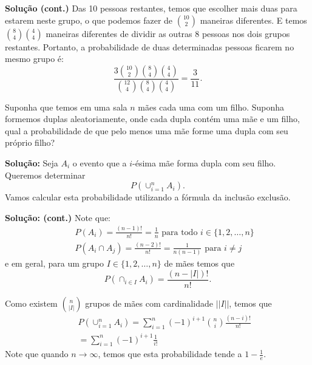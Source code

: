 \begin{frame}
{\bf Solução (cont.)}
Das 10 pessoas restantes, temos que escolher mais duas
para estarem neste grupo, o que podemos fazer de $\binom{10}{2}$
maneiras diferentes. E temos $\binom{8}{4}\binom{4}{4}$ maneiras
diferentes de dividir as outras 8 pessoas nos dois grupos restantes.
Portanto, a probabilidade de duas determinadas pessoas ficarem no
mesmo grupo é:
$$\frac{3\binom{10}{2}\binom{8}{4}\binom{4}{4}}{\binom{12}{4}\binom{8}{4}\binom{4}{4}}=\frac{3}{11}.$$


\begin{exem}
Suponha que temos em uma sala $n$ mães cada uma com um filho. Suponha formemos duplas aleatoriamente, onde cada dupla contém uma mãe e um filho, qual a probabilidade de que pelo menos uma mãe forme uma dupla com seu próprio filho?
\end{exem}

{\bf Solução: } 
Seja $A_i$ o evento que a $i$-ésima mãe forma dupla com seu filho. Queremos determinar
$$P(\cup_{i=1}^{n}A_i).$$
Vamos calcular esta probabilidade utilizando a fórmula da inclusão exclusão. 

\end{frame}

\begin{frame}

{\bf Solução: (cont.)}  Note que:
\begin{eqnarray}
& & P(A_i)=\frac{(n-1)!}{n!}=\frac{1}{n}\mbox{ para todo } i\in\{1,2,\ldots,n\} \nonumber\\
& & P(A_i\cap A_j)=\frac{(n-2)!}{n!}=\frac{1}{n(n-1)}\mbox{ para }i\ne j \nonumber
\end{eqnarray}
e em geral, para um grupo $I\in\{1,2,\ldots,n\}$ de mães temos que
$$P(\cap_{i\in I}A_i)=\frac{(n-|I|)!}{n!}.$$

Como existem $\binom{n}{|I|}$ grupos de mães com cardinalidade $||I||$, temos que
\begin{eqnarray}
& & P(\cup_{i=1}^{n}A_i)=\sum_{i=1}^{n}(-1)^{i+1}\binom{n}{i}\frac{(n-i)!}{n!} \nonumber\\
& & = \sum_{i=1}^{n}(-1)^{i+1}\frac{1}{i!}\nonumber
\end{eqnarray}
Note que quando $n\rightarrow\infty$, temos que esta probabilidade tende a $1-\frac{1}{e}$.
\end{frame}

